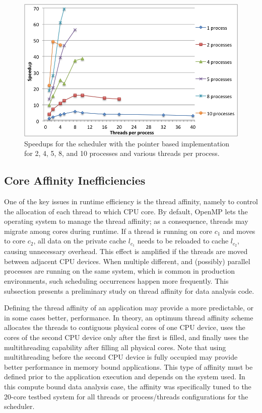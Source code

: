 \begin{figure}[!htp]
	\begin{center}
		\includegraphics[scale=0.5]{charts/speedup_sched.png}
		\caption{Speedups for the scheduler with the pointer based implementation for 2, 4, 5, 8, and 10 processes and various threads per process.}
		\label{fig:Sched}
	\end{center}
\end{figure}

\subsection{Core Affinity Inefficiencies}

One of the key issues in runtime efficiency is the thread affinity\cite{Affinity}, namely to control the allocation of each thread to which CPU core. By default, OpenMP lets the operating system to manage the thread affinity; as a consequence, threads may migrate among cores during runtime. If a thread is running on core $c_1$ and moves to core $c_2$, all data on the private cache $l_{c_1}$ needs to be reloaded to cache $l_{c_2}$, causing unnecessary overhead. This effect is amplified if the threads are moved between adjacent CPU devices. When multiple different, and (possibly) parallel processes are running on the same system, which is common in production environments, such scheduling occurrences happen more frequently. This subsection presents a preliminary study on thread affinity for data analysis code.

Defining the thread affinity of an application may provide a more predictable, or in some cases better, performance. In theory, an optimum thread affinity scheme allocates the threads to contiguous physical cores of one CPU device, uses the cores of the second CPU device only after the first is filled, and finally uses the multithreading capability after filling all physical cores. Note that using multithreading before the second CPU device is fully occupied may provide better performance in memory bound applications. This type of affinity must be defined prior to the application execution and depends on the system used. In this compute bound data analysis case, the affinity was specifically tuned to the 20-core testbed system for all threads or process/threads configurations for the scheduler.

